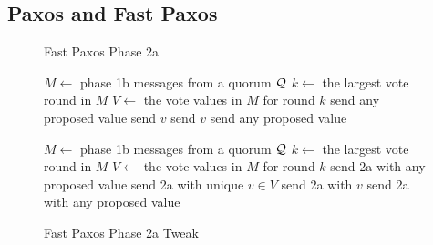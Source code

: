 \subsection{Paxos and Fast Paxos}
\begin{figure}[ht]
  \begin{minipage}[t]{0.48\textwidth}
    \begin{algorithm}[H]
      \caption{Fast Paxos Phase 2a}%
      \begin{algorithmic}[1]
        \State $M \gets$ phase 1b messages from a quorum $\mathcal{Q}$
        \State $k \gets$ the largest vote round in $M$
        \State $V \gets$ the vote values in $M$ for round $k$
          \State send any proposed value 
          \State send $v$ 
          \State send $v$ 
        \Else{}
          \State send any proposed value 
        \EndIf{}
      \end{algorithmic}
    \end{algorithm}
  \end{minipage}%
  \hspace{0.04\textwidth}%
  \begin{minipage}[t]{0.48\textwidth}
    \begin{algorithm}[H]
      \caption{Fast Paxos Phase 2a Tweak}%
      \begin{algorithmic}[1]
        \State $M \gets$ phase 1b messages from a quorum $\mathcal{Q}$
        \State $k \gets$ the largest vote round in $M$
        \State $V \gets$ the vote values in $M$ for round $k$
          \State send 2a with any proposed value 
          \State send 2a with unique $v \in V$ 
          \State send 2a with $v$ 
        \Else{}
          \State send 2a with any proposed value 
        \EndIf{}
      \end{algorithmic}
    \end{algorithm}
  \end{minipage}
\end{figure}

